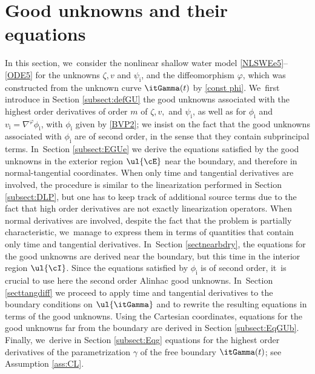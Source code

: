 \section{Good unknowns and their equations}\label{sect:GU}
In this section, we~consider the nonlinear shallow water model \eqref{NLSWEe5}--\eqref{ODE5} for the unknowns $\zeta,v$ and $\psi_\mathrm{i}$,
and the diffeomorphism $\varphi$, which was constructed from the unknown curve $\itGamma(t)$ by \eqref{const phi}. We~first introduce in Section \ref{subsect:defGU} the good unknowns associated with the highest order derivatives of order $m$ of
$\zeta,v,$ and $\psi_\mathrm{i}$, as well as for $\phi_\mathrm{i}$ and $v_\mathrm{i}=\nabla^\varphi \phi_\mathrm{i}$, with $\phi_\mathrm{i}$ given by \eqref{BVP2};
we insist on the fact that the good unknowns associated with $\phi_\mathrm{i}$ are of second order, in the sense that they contain subprincipal terms. In~Section \ref{subsect:EGUe} we derive the equations satisfied by the good unknowns in the exterior region $\ul{\cE}$ near the boundary,
and therefore in normal-tangential coordinates.
When only time and tangential derivatives are involved, the procedure is similar to the linearization performed in Section \ref{subsect:DLP},
but one has to keep track of additional source terms due to the fact that high order derivatives are not exactly linearization operators.
When normal derivatives are involved, despite the fact that the problem is partially characteristic, we~manage to express them in terms of quantities that contain only time and tangential derivatives. In~Section \ref{sectnearbdry}, the equations for the good unknowns are derived near the boundary, but this time in the interior region $\ul{\cI}$.
Since the equations satisfied by $\phi_\mathrm{i}$ is of second order, it~is crucial to use here the second order Alinhac good unknowns. In~Section \ref{secttangdiff} we proceed to apply time and tangential derivatives to the boundary conditions on $\ul{\itGamma}$
and to rewrite the resulting equations in terms of the good unknowns.
Using the Cartesian coordinates, equations for the good unknowns far from the boundary are derived in Section \ref{subsect:EqGUb}.
Finally, we~derive in Section \ref{subsect:Eqg} equations for the highest order derivatives of the parametrization $\gamma$ of the free boundary $\itGamma(t)$;
see Assumption \ref{ass:CL}.

